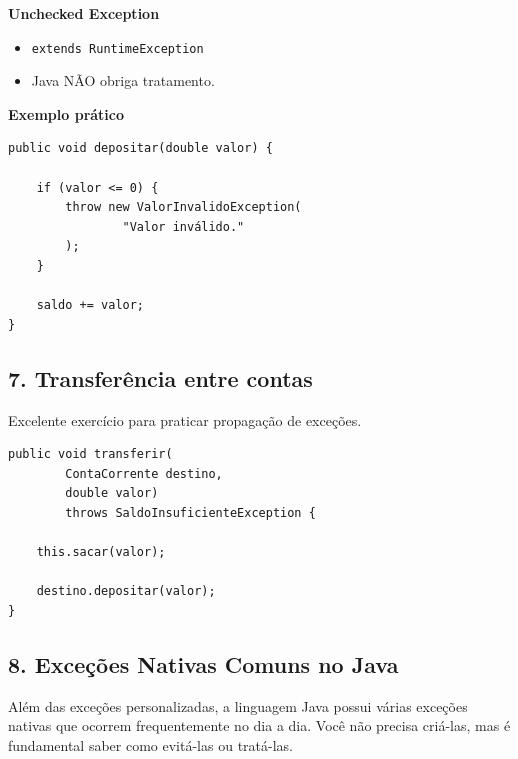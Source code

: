 \documentclass[12pt,a4paper]{article}
\begin{document}
\textbf{Unchecked Exception}
\begin{itemize}
    \item \texttt{extends RuntimeException}
    \item Java NÃO obriga tratamento.
\end{itemize}

\textbf{Exemplo prático}
\begin{lstlisting}
public void depositar(double valor) {

    if (valor <= 0) {
        throw new ValorInvalidoException(
                "Valor inválido."
        );
    }

    saldo += valor;
}
\end{lstlisting}

\subsection*{7. Transferência entre contas}
Excelente exercício para praticar propagação de exceções.
\begin{lstlisting}
public void transferir(
        ContaCorrente destino,
        double valor)
        throws SaldoInsuficienteException {

    this.sacar(valor);
 
    destino.depositar(valor);
}
\end{lstlisting}

\subsection*{8. Exceções Nativas Comuns no Java}
Além das exceções personalizadas, a linguagem Java possui várias exceções nativas que ocorrem frequentemente no dia a dia. Você não precisa criá-las, mas é fundamental saber como evitá-las ou tratá-las.
\end{document}
